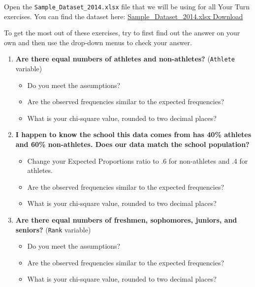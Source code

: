 \documentclass[
]{book}
\begin{document}
Open the \texttt{Sample\_Dataset\_2014.xlsx} file that we will be using for all Your Turn exercises. You can find the dataset here: \href{https://github.com/danawanzer/stats-with-jamovi/blob/master/data/Sample_Dataset_2014.xlsx}{Sample\_Dataset\_2014.xlsx Download}

To get the most out of these exercises, try to first find out the answer on your own and then use the drop-down menus to check your answer.

\begin{enumerate}
\def\labelenumi{\arabic{enumi}.}
\item
  \textbf{Are there equal numbers of athletes and non-athletes?} (\texttt{Athlete} variable)

  \begin{itemize}
  \item
    Do you meet the assumptions?
  \item
    Are the observed frequencies similar to the expected frequencies?
  \item
    What is your chi-square value, rounded to two decimal places?
  \end{itemize}
\item
  \textbf{I happen to know the school this data comes from has 40\% athletes and 60\% non-athletes. Does our data match the school population?}

  \begin{itemize}
  \item
    Change your Expected Proportions ratio to .6 for non-athletes and .4 for athletes.
  \item
    Are the observed frequencies similar to the expected frequencies?
  \item
    What is your chi-square value, rounded to two decimal places?
  \end{itemize}
\item
  \textbf{Are there equal numbers of freshmen, sophomores, juniors, and seniors?} (\texttt{Rank} variable)

  \begin{itemize}
  \item
    Do you meet the assumptions?
  \item
    Are the observed frequencies similar to the expected frequencies?
  \item
    What is your chi-square value, rounded to two decimal places?
  \end{itemize}
\end{enumerate}
\end{document}
